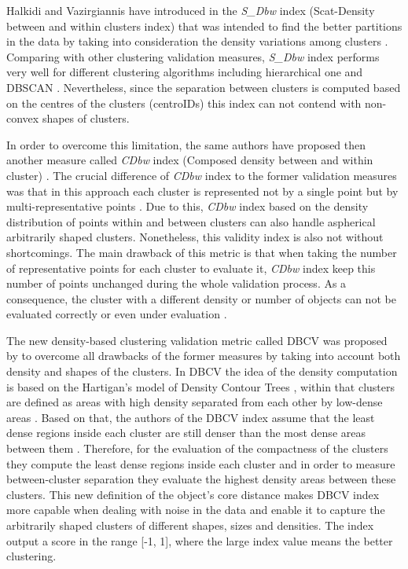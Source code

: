 \documentclass[fontsize=12pt,a4paper,twoside,openany]{scrbook}
\begin{document}
Halkidi and Vazirgiannis have introduced in \cite*{Halkidi01b} the \emph{S\_Dbw} index (Scat-Density between and within clusters index) that was intended to find the better partitions in the data by taking into consideration the density variations among clusters \parencite{Halkidi01b}. Comparing with other clustering validation measures, \emph{S\_Dbw} index performs very well for different clustering algorithms including hierarchical one and DBSCAN \parencite{Liu10}. Nevertheless, since the separation between clusters is computed based on the centres of the clusters (centroIDs) this index can not contend with non-convex shapes of clusters.

In order to overcome this limitation, the same authors have proposed then another measure called \emph{CDbw} index (Composed density between and within cluster) \parencite{Halkidi08}. The crucial difference of \emph{CDbw} index to the former validation measures was that in this approach each cluster is represented not by a single point but by multi-representative points \parencite{Halkidi08}. Due to this, \emph{CDbw} index based on the density distribution of points within and between clusters can also handle aspherical arbitrarily shaped clusters. Nonetheless, this validity index is also not without shortcomings. The main drawback of this metric is that when taking the number of representative points for each cluster to evaluate it, \emph{CDbw} index keep this number of points unchanged during the whole validation process. As a consequence, the cluster with a different density or number of objects can not be evaluated correctly or even under evaluation \parencite{Moulavi14}.

The new density-based clustering validation metric called DBCV was proposed by \textcite{Moulavi14} to overcome all drawbacks of the former measures by taking into account both density and shapes of the clusters. In DBCV the idea of the density computation is based on the Hartigan’s model of Density Contour Trees \parencite{Hartigan75}, within that clusters are defined as areas with high density separated from each other by low-dense areas \parencite{Moulavi14, Hartigan75}. Based on that, the authors of the DBCV index assume that the least dense regions inside each cluster are still denser than the most dense areas between them \parencite{Moulavi14}. Therefore, for the evaluation of the compactness of the clusters they compute the least dense regions inside each cluster and in order to measure between-cluster separation they evaluate the highest density areas between these clusters. This new definition of the object's core distance makes DBCV index more capable when dealing with noise in the data and enable it to capture the arbitrarily shaped clusters of different shapes, sizes and densities. The index output a score in the range [-1, 1], where the large index value means the better clustering.
\end{document}
